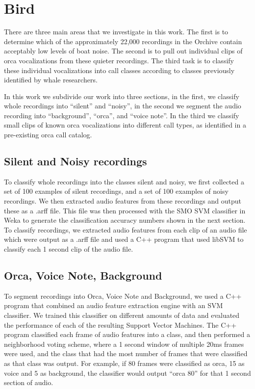 \section{Bird}


There are three main areas that we investigate in this work.  The
first is to determine which of the approximately 22,000 recordings in
the Orchive contain acceptably low levels of boat noise.  The second
is to pull out individual clips of orca vocalizations from these
quieter recordings.  The third task is to classify these individual
vocalizations into call classes according to classes previously
identified by whale researchers.

In this work we subdivide our work into three sections, in the first,
we classify whole recordings into ``silent'' and ``noisy'', in the
second we segment the audio recording into ``background'', ``orca'',
and ``voice note''.  In the third we classify small clips of known
orca vocalizations into different call types, as identified in a
pre-existing orca call catalog.

\subsection{Silent and Noisy recordings}

To classify whole recordings into the classes silent and noisy, we
first collected a set of 100 examples of silent recordings, and a set
of 100 examples of noisy recordings.  We then extracted audio features
from these recordings and output these as a .arff file.  This file was
then processed with the SMO SVM classifier in Weka to generate the
classification accuracy numbers shown in the next section.  To
classify recordings, we extracted audio features from each clip of an
audio file which were output as a .arff file and used a C++ program
that used libSVM to classify each 1 second clip of the audio file.

\subsection{Orca, Voice Note, Background}

To segment recordings into Orca, Voice Note and Background, we used a
C++ program that combined an audio feature extraction engine with an
SVM classifier. We trained this classifier on different amounts of
data and evaluated the performance of each of the resulting Support
Vector Machines.  The C++ program classified each frame of audio
features into a class, and then performed a neighborhood voting
scheme, where a 1 second window of multiple 20ms frames were used, and
the class that had the most number of frames that were classified as
that class was output.  For example, if 80 frames were classified as
orca, 15 as voice and 5 as background, the classifier would output
``orca 80'' for that 1 second section of audio.

